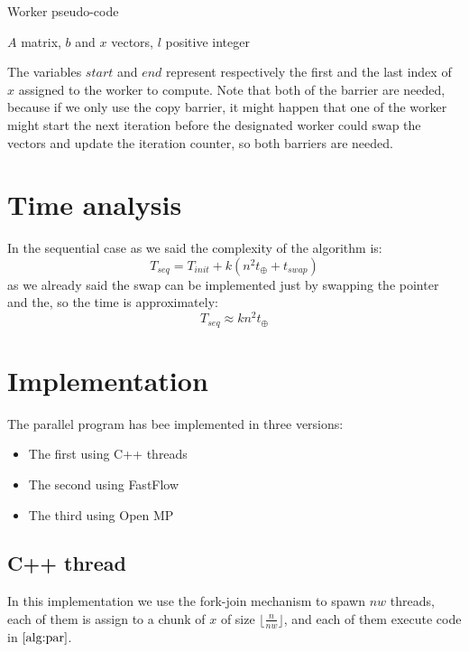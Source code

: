 \documentclass[12pt]{article}
\begin{document}
	
	\begin{algorithm}[H]
		\caption{Worker pseudo-code}\label{alg:par}
		\begin{algorithmic}[1]
			\Require $A$ matrix, $b$ and $x$ vectors, $l$ positive integer
			\EndIf
			\EndFor
			\EndFor
			\EndIf
			\EndWhile
		\end{algorithmic}
	\end{algorithm}
	The variables $start$ and $end$ represent respectively the first and the last index of $x$ assigned to the worker to compute. Note that both of the barrier are needed, because if we only use the copy barrier, it might happen that one of the worker might start the next iteration before the designated worker could swap the vectors and update the iteration counter, so both barriers are needed. 
	
	\section{Time analysis}
	In the sequential case as we said the complexity of the algorithm is:
	\[ T_{seq} = T_{init} + k(n^2t_\oplus + t_{swap}) \]
	as we already said the swap can be implemented just by swapping the pointer and the, so the time is approximately:
	\[ T_{seq} \approx kn^2t_\oplus\]
	
	
	\section{Implementation}
	The parallel program has bee implemented in three versions:
	\begin{itemize}
		\item The first using C++ threads 
		\item The second using FastFlow
		\item The third using Open MP
	\end{itemize}
	\subsection{C++ thread}
	In this implementation we use the fork-join mechanism to spawn $nw$ threads, each of them is assign to a chunk of $x$ of size $\lfloor\frac{n}{nw}\rfloor$, and each of them execute code in $\ref{alg:par}$.
\end{document}
